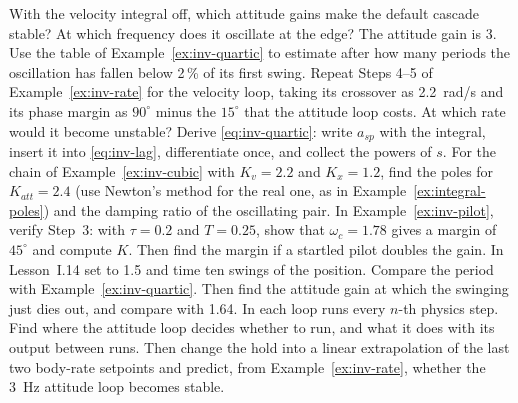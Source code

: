 \begin{exercises}
\exercise[1] With the velocity integral off, which attitude gains make the default cascade stable? At which frequency does it oscillate at the edge?
\exercise[1] The attitude gain is 3. Use the table of Example~\ref{ex:inv-quartic} to estimate after how many periods the oscillation has fallen below 2\,\% of its first swing.
\exercise[1] Repeat Steps 4–5 of Example~\ref{ex:inv-rate} for the velocity loop, taking its crossover as \SI{2.2}{rad/s} and its phase margin as $90^\circ$ minus the $15^\circ$ that the attitude loop costs. At which rate would it become unstable?
\exercise[2] Derive \cref{eq:inv-quartic}: write $a_{sp}$ with the integral, insert it into \cref{eq:inv-lag}, differentiate once, and collect the powers of $s$.
\exercise[2] For the chain of Example~\ref{ex:inv-cubic} with $K_v = 2.2$ and $K_x = 1.2$, find the poles for $K_{att} = 2.4$ (use Newton's method for the real one, as in Example~\ref{ex:integral-poles}) and the damping ratio of the oscillating pair.
\exercise[2] In Example~\ref{ex:inv-pilot}, verify Step~3: with $\tau = 0.2$ and $T = 0.25$, show that $\omega_c = 1.78$ gives a margin of $45^\circ$ and compute $K$. Then find the margin if a startled pilot doubles the gain.
\exercise[2] In Lesson~I.14 set  to 1.5 and time ten swings of the position. Compare the period with Example~\ref{ex:inv-quartic}. Then find the attitude gain at which the swinging just dies out, and compare with 1.64.
\exercise[2] In  each loop runs every $n$-th physics step. Find where the attitude loop decides whether to run, and what it does with its output between runs. Then change the hold into a linear extrapolation of the last two body-rate setpoints and predict, from Example~\ref{ex:inv-rate}, whether the \SI{3}{Hz} attitude loop becomes stable.

\end{exercises}
